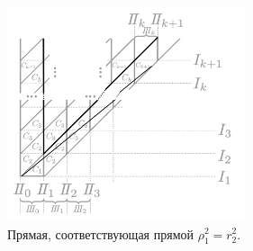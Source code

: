 \begin{figure}[!htb]
\centering
\includegraphics[width=7cm]{images/ch4/section3_circular/B1Prime_lattice.pdf}
    \caption{Прямая, соответствующая прямой $\rho_1^2 = r_2^2$.}
    \label{fig:pt10:_B1Prime_lattice}
\end{figure}


